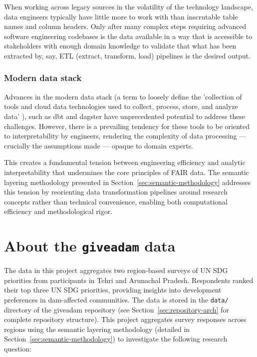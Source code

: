 \documentclass{article}
\begin{document}
When working across legacy sources in the volatility of the technology landscape, data engineers typically have little more to work with than inscrutable table names and column headers. Only after many complex steps requiring advanced software engineering codebases is the data available in a way that is accessible to stakeholders with enough domain knowledge to validate that what has been extracted by, say, ETL (extract, transform, load) pipelines is the desired output. 

\subsubsection{Modern data stack}

Advances in the modern data stack (a term to loosely define the 'collection of tools and cloud data technologies used to collect, process, store, and analyze data' \cite{prakashWhatDefinesModern2023}), such as dbt \cite{dbt_core} and dagster \cite{dagster} have unprecedented potential to address these challenges. However, there is a prevailing tendency for these tools to be oriented to interpretability by engineers, rendering the complexity of data processing --- crucially the assumptions made --- opaque to domain experts.

This creates a fundamental tension between engineering efficiency and analytic interpretability that undermines the core principles of FAIR data. The semantic layering methodology presented in Section~\ref{sec:semantic-methodology} addresses this tension by reorienting data transformation pipelines around research concepts rather than technical convenience, enabling both computational efficiency and methodological rigor.

\section{About the \texttt{giveadam} data}
\label{sec:aboutdata}

The data in this project aggregates two region-based surveys of UN SDG priorities from participants in Tehri and Arunachal Pradesh. Respondents ranked their top three UN SDG priorities, providing insights into development preferences in dam-affected communities. The data is stored in the \texttt{data/} directory of the giveadam repository (see Section~\ref{sec:repository-arch} for complete repository structure). This project aggregates survey responses across regions using the semantic layering methodology (detailed in Section~\ref{sec:semantic-methodology}) to investigate the following research question:
\end{document}
